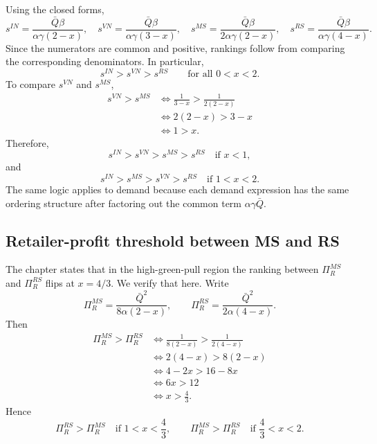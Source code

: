 Using the closed forms,
\begin{equation}
 s^{IN}=\frac{\bar Q\beta}{\alpha\gamma(2-x)},
 \quad
 s^{VN}=\frac{\bar Q\beta}{\alpha\gamma(3-x)},
 \quad
 s^{MS}=\frac{\bar Q\beta}{2\alpha\gamma(2-x)},
 \quad
 s^{RS}=\frac{\bar Q\beta}{\alpha\gamma(4-x)}.
\end{equation}
Since the numerators are common and positive, rankings follow from comparing the
corresponding denominators. In particular,
\begin{equation}
 s^{IN}>s^{VN}>s^{RS}
 \qquad\text{for all }0<x<2.
\end{equation}
To compare $s^{VN}$ and $s^{MS}$,
\begin{align}
 s^{VN}>s^{MS}
 &\iff \frac{1}{3-x}>\frac{1}{2(2-x)} \\
 &\iff 2(2-x)>3-x \\
 &\iff 1>x.
\end{align}
Therefore,
\begin{equation}
 s^{IN}>s^{VN}>s^{MS}>s^{RS}
 \quad\text{if }x<1,
\end{equation}
and
\begin{equation}
 s^{IN}>s^{MS}>s^{VN}>s^{RS}
 \quad\text{if }1<x<2.
\end{equation}
The same logic applies to demand because each demand expression has the same
ordering structure after factoring out the common term $\alpha\gamma\bar Q$.

\subsection{Retailer-profit threshold between MS and RS}

The chapter states that in the high-green-pull region the ranking between
$\Pi_R^{MS}$ and $\Pi_R^{RS}$ flips at $x=4/3$. We verify that here.
Write
\begin{equation}
 \Pi_R^{MS}=\frac{\bar Q^2}{8\alpha(2-x)},
 \qquad
 \Pi_R^{RS}=\frac{\bar Q^2}{2\alpha(4-x)}.
\end{equation}
Then
\begin{align}
 \Pi_R^{MS}>\Pi_R^{RS}
 &\iff \frac{1}{8(2-x)}>\frac{1}{2(4-x)} \\
 &\iff 2(4-x)>8(2-x) \\
 &\iff 4-2x>16-8x \\
 &\iff 6x>12 \\
 &\iff x>\frac{4}{3}.
\end{align}
Hence
\begin{equation}
 \Pi_R^{RS}>\Pi_R^{MS}
 \quad\text{if }1<x<\frac{4}{3},
 \qquad
 \Pi_R^{MS}>\Pi_R^{RS}
 \quad\text{if }\frac{4}{3}<x<2.
\end{equation}

